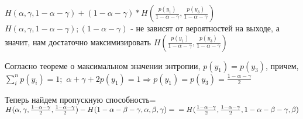 \documentclass[../main.tex]{subfiles}
\begin{document}
$H(\alpha, \gamma, 1-\alpha-\gamma) + (1-\alpha-\gamma)*H(\frac{p(y_1)}{1-\alpha-\gamma}, \frac{p(y_3)}{1-\alpha-\gamma})$ \newline
$H(\alpha, \gamma, 1-\alpha-\gamma); (1-\alpha-\gamma)$ - не зависят от вероятностей на выходе, а значит, нам достаточно максимизировать $H(\frac{p(y_1)}{1-\alpha-\gamma}, \frac{p(y_3)}{1-\alpha-\gamma})$

Согласно теореме о максимальном значении энтропии, $p(y_1) = p(y_3)$, причем, $\sum\limits_{i}^{n}p(y_i)=1;$\newline
$\alpha + \gamma + 2p(y_1) =1 \Rightarrow p(y_1) = p(y_3) = \frac{1-\alpha-\gamma}{2}$

Теперь найдем пропускную способность= $H(\alpha, \gamma, \frac{1-\alpha-\gamma}{2}, \frac{1-\alpha-\gamma}{2}) - H(1-\alpha-\beta - \gamma, \alpha, \beta, \gamma) = \newline =H(\frac{1-\alpha-\gamma}{2},\frac{1-\alpha-\gamma}{2}, 1-\alpha-\beta - \gamma, \beta)$
\end{document}
